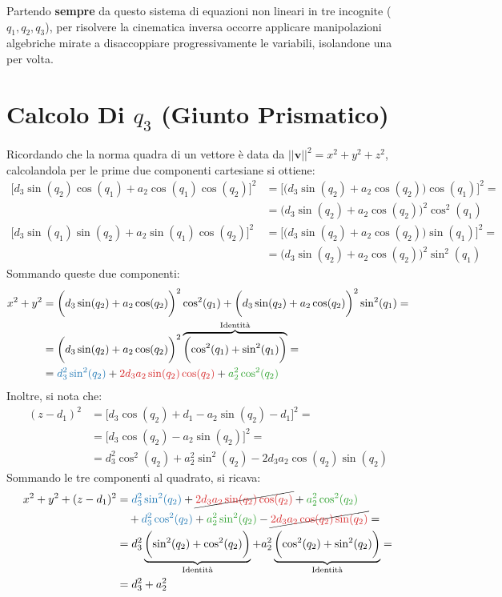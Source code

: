 \documentclass[11pt, a4paper]{report}
\begin{document}
Partendo \textbf{sempre} da questo sistema di equazioni non lineari in tre incognite ($q_1, q_2, q_3$), per risolvere la cinematica inversa occorre applicare manipolazioni algebriche mirate a disaccoppiare progressivamente le variabili, isolandone una per volta.

\section{Calcolo Di $q_3$ (Giunto Prismatico)}
Ricordando che la norma quadra di un vettore è data da $|| \bm{v} ||^2 = x^2 + y^2 + z^2$, calcolandola per le prime due componenti cartesiane si ottiene:
\begin{align*}
    \biggl[d_3 \sin(q_2) \cos(q_1) + a_2 \cos(q_1) \cos(q_2)\biggr]^{2} &=\biggl[ \biggl(d_3 \sin(q_2) + a_2 \cos(q_2)\biggr) \cos(q_1) \biggr]^{2} = \\
    &= \biggl(d_3 \sin(q_2) + a_2 \cos(q_2)\biggr)^{2} \cos^2(q_1) \\
    \biggl[d_3 \sin(q_1) \sin(q_2) + a_2 \sin(q_1) \cos(q_2)\biggr]^{2} &= \biggl[ \biggl(d_3 \sin(q_2) + a_2 \cos(q_2)\biggr) \sin(q_1) \biggr]^{2} = \\
    &= \biggl(d_3 \sin(q_2) + a_2 \cos(q_2)\biggr)^{2} \sin^2(q_1)
\end{align*}
Sommando queste due componenti:
\begin{align*}
    x^{2} + y^{2} &= \biggl(d_3 \sin(q_2) + a_2 \cos(q_2)\biggr)^{2} \cos^2(q_1) + \biggl(d_3 \sin(q_2) + a_2 \cos(q_2)\biggr)^{2} \sin^2(q_1) = \\
    &= \biggl(d_3 \sin(q_2) + a_2 \cos(q_2)\biggr)^{2} \overbrace{\biggl(\cos^2(q_1) + \sin^2(q_1)\biggr)}^{\text{Identità}} = \\
    &= \textcolor{mathBlue}{d_{3}^{2}\sin^{2}(q_{2})} + \textcolor{mathRed}{2d_{3}a_{2}\sin(q_{2})\cos(q_{2})} + \textcolor{mathGreen}{a_{2}^{2}\cos^{2}(q_{2})}
\end{align*}
Inoltre, si nota che:
\begin{align*}
    (z - d_{1})^{2} &= \biggl[d_3 \cos(q_2) + d_1 - a_2 \sin(q_2) - d_{1}\biggr]^2 =\\
    &= \biggl[d_3 \cos(q_2) - a_2 \sin(q_2)\biggr]^{2} =\\
    &= d_{3}^{2} \cos^{2}(q_{2}) + a_{2}^{2} \sin^{2}(q_{2}) - 2 d_{3} a_{2} \cos(q_{2}) \sin(q_{2})
\end{align*}
Sommando le tre componenti al quadrato, si ricava:
\begin{align*}
    x^{2} + y^{2} + (z - d_{1})^{2} &= \textcolor{mathBlue}{d_{3}^{2}\sin^{2}(q_{2})} + \cancel{\textcolor{mathRed}{2d_{3}a_{2}\sin(q_{2})\cos(q_{2})}} + \textcolor{mathGreen}{a_{2}^{2}\cos^{2}(q_{2})}\\
    & \quad + \textcolor{mathBlue}{d_{3}^{2} \cos^{2}(q_{2})} + \textcolor{mathGreen}{a_{2}^{2} \sin^{2}(q_{2})} - \cancel{\textcolor{mathRed}{2 d_{3} a_{2} \cos(q_{2}) \sin(q_{2})}} =\\
    &= d_{3}^{2} \underbrace{\biggl(\sin^{2}(q_{2}) + \cos^{2}(q_{2})\biggr)}_{\text{Identità}} + a_{2}^{2} \underbrace{\biggl(\cos^{2}(q_{2}) + \sin^{2}(q_{2})\biggr)}_{\text{Identità}} =\\
    &= d_{3}^{2} + a_{2}^{2}
\end{align*}
\end{document}
